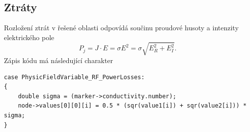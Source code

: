 \subsection*{Ztráty}
Rozložení ztrát v řešené oblasti odpovídá součinu proudové husoty a intenzity elektrického pole 
\begin{displaymath}
	P_j = J \cdot E = \sigma E^{2} = \sigma \sqrt{E_{R}^{2} + E_{I}^{2}}.
\end{displaymath}
Zápis kódu má následující charakter
\begin{verbatim}
case PhysicFieldVariable_RF_PowerLosses:
{
    double sigma = (marker->conductivity.number);
    node->values[0][0][i] = 0.5 * (sqr(value1[i]) + sqr(value2[i])) * sigma;
}
\end{verbatim}
